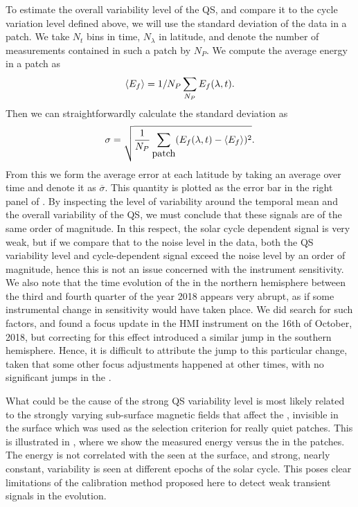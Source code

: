 \documentclass{aa}
\begin{document}
To estimate 
the overall variability level of the QS, and compare it to the cycle variation level defined above,
we will use the standard deviation of the data in a patch.
We take $N_t$ bins in time, $N_\lambda$ in latitude, and denote the number of \ef{} measurements contained in such a patch by $N_P$. We compute the average \fff energy in a patch as
\begin{equation}
\langle E_f \rangle=1/N_P \sum_{N_P} E_f (\lambda,t).
\end{equation}
Then we can straightforwardly calculate the standard deviation as
\begin{equation}
\sigma= \sqrt{\frac{1}{N_P}\sum_{\mbox{patch}} ( E_f(\lambda,t)
- \left<{E_f} \right>)^2}.
\end{equation}
From this we form the average error at each latitude by taking an average over time and denote it as $\overline{\sigma}$. 
This quantity is plotted as the error bar in the right panel of 
.
By inspecting the level of variability around the temporal mean and the 
overall variability of the QS, we must conclude that these signals are of the same order of magnitude. 
In this respect, the solar cycle dependent signal is very weak, but if we compare that to the noise level in the data, both the QS variability level and cycle-dependent signal exceed the noise level by an order of magnitude, hence this is not an issue concerned with the instrument sensitivity. We also note that the time evolution of the \fff in the northern hemisphere between the third and fourth quarter of the year 2018 appears very abrupt, as if some instrumental change in sensitivity would have taken place. We did search for such factors, and found a focus update in the HMI instrument on the 16th of October, 2018, but correcting for this effect introduced a similar jump in the southern hemisphere. Hence, it is difficult to attribute the jump to this particular change, taken that some other focus adjustments happened at other times, with no significant jumps in the \fffns.

What could be the cause of the strong QS variability level is most likely related to the strongly varying sub-surface magnetic fields that affect the \fffns,
invisible in
the surface \brms{} which was used as the selection criterion for really quiet patches. 
This is illustrated in , where we show the measured \fff energy versus the \brms{} in the patches. The \fff energy is not correlated with the \brms{} seen at the surface, and strong, nearly constant, variability is seen at different epochs of the solar cycle. This poses clear limitations of the calibration method proposed here to detect weak transient signals in the \fff evolution.
\end{document}
